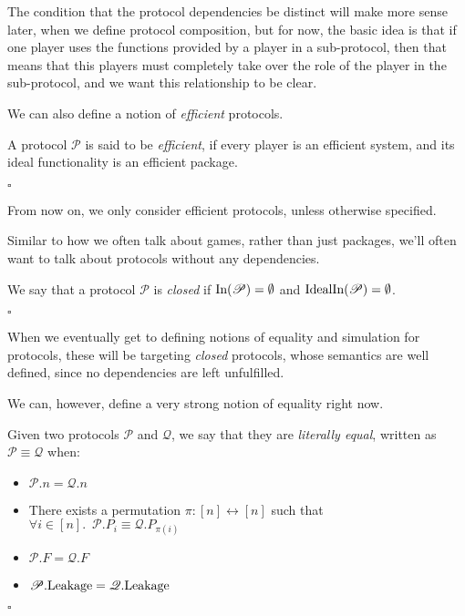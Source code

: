 The condition that the protocol dependencies be distinct
will make more sense later, when we define protocol composition,
but for now, the basic idea is that if one player uses
the functions provided by a player in a sub-protocol,
then that means that this players must completely take over
the role of the player in the sub-protocol,
and we want this relationship to be clear.

We can also define a notion of \emph{efficient} protocols.

\begin{definition}
  A protocol $\mathscr{P}$ is said to be \emph{efficient},
  if every player is an efficient system, and its ideal functionality
  is an efficient package.

  $\square$
\end{definition}

From now on, we only consider efficient protocols, unless otherwise
specified.

Similar to how we often talk about games, rather than just packages,
we'll often want to talk about protocols without any dependencies.

\begin{definition}
  We say that a protocol $\mathscr{P}$ is \emph{closed} if
  $\text{In}(\mathscr{P}) = \emptyset$ and $\text{IdealIn}(\mathscr{P}) = \emptyset$.

  $\square$
\end{definition}

When we eventually get to defining notions of equality and simulation
for protocols, these will be targeting \emph{closed} protocols,
whose semantics are well defined, since no dependencies are left unfulfilled.

We can, however, define a very strong notion of equality right now.

\begin{definition}
Given two protocols $\mathscr{P}$ and $\mathscr{Q}$, we say that
they are \emph{literally equal}, written as $\mathscr{P} \equiv \mathscr{Q}$
when:
\begin{itemize}
\item $\mathscr{P}.n = \mathscr{Q}.n$
\item There exists a permutation $\pi : [n] \leftrightarrow [n]$ such that
$
{\forall i \in [n].\enspace \mathscr{P}.P_i \equiv \mathscr{Q}.P_{\pi(i)}}
$
\item $\mathscr{P}.F = \mathscr{Q}.F$
\item $\mathscr{P}.\text{Leakage} = \mathscr{Q}.\text{Leakage}$
\end{itemize}

$\square$
\end{definition}

